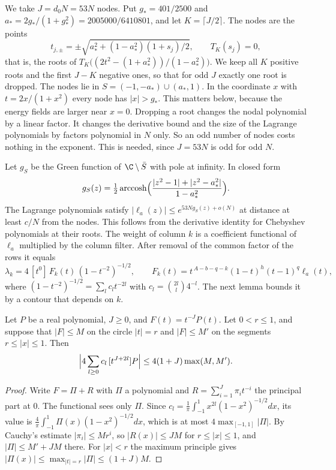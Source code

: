 We take $J=d_0N=53N$ nodes. Put $g_*=401/2500$ and $a_*=2g_*/(1+g_*^2)=2005000/6410801$, and let
$K=\lceil J/2\rceil$. The nodes are the points
\[
 t_{j,\pm}=\pm\sqrt{a_*^2+(1-a_*^2)(1+s_j)/2},\qquad T_K(s_j)=0,
\]
that is, the roots of $T_K\bigl((2t^2-(1+a_*^2))/(1-a_*^2)\bigr)$. We keep all $K$ positive roots and the
first $J-K$ negative ones, so that for odd $J$ exactly one root is dropped. The nodes lie in
$S=(-1,-a_*)\cup(a_*,1)$. In the coordinate $x$ with $t=2x/(1+x^2)$ every node has $|x|>g_*$. This matters
below, because the energy fields are larger near $x=0$. Dropping a root changes the nodal polynomial by a
linear factor. It changes the derivative bound and the size of the Lagrange polynomials by factors
polynomial in $N$ only. So an odd number of nodes costs nothing in the exponent. This is needed, since
$J=53N$ is odd for odd $N$.

Let $g_S$ be the Green function of $\C\setminus\bar S$ with pole at infinity. In closed form
\[
 g_S(z)=\tfrac12\operatorname{arccosh}\Bigl(\frac{|z^2-1|+|z^2-a_*^2|}{1-a_*^2}\Bigr).
\]
The Lagrange polynomials satisfy $|\ell_a(z)|\le e^{53Ng_S(z)+o(N)}$ at distance at least $c/N$ from the
nodes. This follows from the derivative identity for Chebyshev polynomials at their roots. The weight of
column $k$ is a coefficient functional of $\ell_a$ multiplied by the column filter. After removal of the
common factor of the rows it equals
\[
 \lambda_k=4\,[t^0]\,F_k(t)\,(1-t^{-2})^{-1/2},\qquad F_k(t)=t^{\,A-b-q-k}(1-t)^h(t-1)^q\ell_a(t),
\]
where $(1-t^{-2})^{-1/2}=\sum_lc_lt^{-2l}$ with $c_l=\binom{2l}l4^{-l}$. The next lemma bounds it by a
contour that depends on $k$.

\begin{lemma}\label{lem:keyhole}
Let $P$ be a real polynomial, $J\ge0$, and $F(t)=t^{-J}P(t)$. Let $0<r\le1$, and suppose that $|F|\le M$ on
the circle $|t|=r$ and $|F|\le M'$ on the segments $r\le|x|\le1$. Then
\[
 \Bigl|4\sum_{l\ge0}c_l\,[t^{J+2l}]P\Bigr|\le4(1+J)\max(M,M').
\]
\end{lemma}

\begin{proof}
Write $F=\Pi+R$ with $\Pi$ a polynomial and $R=\sum_{i=1}^J\pi_it^{-i}$ the principal part at $0$. The
functional sees only $\Pi$. Since $c_l=\frac1\pi\int_{-1}^1x^{2l}(1-x^2)^{-1/2}dx$, its value is
$\frac4\pi\int_{-1}^1\Pi(x)(1-x^2)^{-1/2}dx$, which is at most $4\max_{[-1,1]}|\Pi|$. By Cauchy's estimate
$|\pi_i|\le Mr^i$, so $|R(x)|\le JM$ for $r\le|x|\le1$, and $|\Pi|\le M'+JM$ there. For $|x|<r$ the maximum
principle gives $|\Pi(x)|\le\max_{|t|=r}|\Pi|\le(1+J)M$.
\end{proof}

